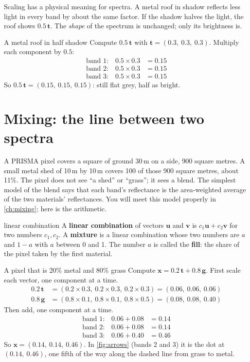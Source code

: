 \documentclass[11pt,a4paper,oneside,openany]{book}
\newcommand{\B}[1]{{\symbf{#1}}}
\newcommand{\B}[1]{{\bm{#1}}}
\newcommand{\vx}{\B{x}}
\newcommand{\vt}{\B{t}}
\newcommand{\vu}{\B{u}}
\newcommand{\vv}{\B{v}}
\newcommand{\vg}{\B{g}}
\begin{document}
Scaling has a physical meaning for spectra. A metal roof in shadow reflects less light in every band by about the same
factor. If the shadow halves the light, the roof shows $0.5\,\vt$. The \emph{shape} of the spectrum is unchanged; only its
brightness is.

\begin{worked}[label=we:scale]{A metal roof in half shadow}
Compute $0.5\,\vt$ with $\vt=(0.3,\ 0.3,\ 0.3)$. Multiply each component by $0.5$:
\begin{align*}
\text{band 1:}\quad 0.5\times0.3 &= 0.15\\
\text{band 2:}\quad 0.5\times0.3 &= 0.15\\
\text{band 3:}\quad 0.5\times0.3 &= 0.15
\end{align*}
So $0.5\,\vt=(0.15,\ 0.15,\ 0.15)$: still flat grey, half as bright.
\end{worked}

\section{Mixing: the line between two spectra}
\label{sec:mixline}

A PRISMA pixel covers a square of ground 30\,m on a side, 900 square metres. A small metal shed of 10\,m by 10\,m covers
100 of those 900 square metres, about 11\%. The pixel does not see ``a shed'' or ``grass''; it sees a blend. The
simplest model of the blend says that each band's reflectance is the area-weighted average of the two materials'
reflectances. You will meet this model properly in \cref{ch:mixing}; here is the arithmetic.

\begin{defn}{linear combination}
A \textbf{linear combination} of vectors $\vu$ and $\vv$ is $c_1\vu+c_2\vv$ for two numbers $c_1,c_2$. A
\textbf{mixture} is a linear combination whose two numbers are $a$ and $1-a$ with $a$ between 0 and 1. The number $a$ is
called the \textbf{fill}: the share of the pixel taken by the first material.
\end{defn}

\begin{worked}[label=we:mix]{A pixel that is 20\% metal and 80\% grass}
Compute $\vx=0.2\,\vt+0.8\,\vg$. First scale each vector, one component at a time.
\begin{align*}
0.2\,\vt &= (0.2\times0.3,\ 0.2\times0.3,\ 0.2\times0.3) = (0.06,\ 0.06,\ 0.06)\\
0.8\,\vg &= (0.8\times0.1,\ 0.8\times0.1,\ 0.8\times0.5) = (0.08,\ 0.08,\ 0.40)
\end{align*}
Then add, one component at a time.
\begin{align*}
\text{band 1:}\quad 0.06+0.08 &= 0.14\\
\text{band 2:}\quad 0.06+0.08 &= 0.14\\
\text{band 3:}\quad 0.06+0.40 &= 0.46
\end{align*}
So $\vx=(0.14,\ 0.14,\ 0.46)$. In \cref{fig:arrows} (bands 2 and 3) it is the dot at $(0.14,\ 0.46)$, one fifth of the way
along the dashed line from grass to metal.
\end{worked}
\end{document}
